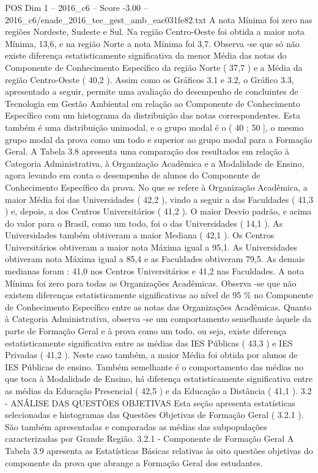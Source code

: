 \begin{textsample}{POS Dim 1 – 2016\_c6 – Score -3.00 – 2016\_c6/enade\_2016\_tec\_gest\_amb\_eac031fe82.txt}
A nota Mínima foi zero nas regiões Nordeste, Sudeste e Sul.
Na região Centro-Oeste foi obtida a maior nota Mínima, 13,6, e na região Norte a nota Mínima foi 3,7.
Observa -se que só não existe diferença estatisticamente significativa da menor Média das notas do Componente de Conhecimento Específico da região Norte ( 37,7 ) e a Média da região Centro-Oeste ( 40,2 ).
Assim como os Gráficos 3.1 e 3.2, o Gráfico 3.3, apresentado a seguir, permite uma avaliação do desempenho de concluintes de Tecnologia em Gestão Ambiental em relação ao Componente de Conhecimento Específico com um histograma da distribuição das notas correspondentes.
Esta também é uma distribuição unimodal, e o grupo modal é o ( 40 ; 50 ], o mesmo grupo modal da prova como um todo e superior ao grupo modal para a Formação Geral.
A Tabela 3.8 apresenta uma comparação dos resultados em relação à Categoria Administrativa, à Organização Acadêmica e a Modalidade de Ensino, agora levando em conta o desempenho de alunos do Componente de Conhecimento Específico da prova.
No que se refere à Organização Acadêmica, a maior Média foi das Universidades ( 42,2 ), vindo a seguir a das Faculdades ( 41,3 ) e, depois, a dos Centros Universitários ( 41,2 ).
O maior Desvio padrão, e acima do valor para o Brasil, como um todo, foi o das Universidades ( 14,1 ).
As Universidades também obtiveram a maior Mediana ( 42,1 ).
Os Centros Universitários obtiveram a maior nota Máxima igual a 95,1.
As Universidades obtiveram nota Máxima igual a 85,4 e as Faculdades obtiveram 79,5.
As demais medianas foram : 41,0 nos Centros Universitários e 41,2 nas Faculdades.
A nota Mínima foi zero para todas as Organizações Acadêmicas.
Observa -se que não existem diferenças estatisticamente significativas ao nível de 95 \% no Componente de Conhecimento Específico entre as notas das Organizações Acadêmicas.
Quanto à Categoria Administrativa, observa -se um comportamento semelhante àquele da parte de Formação Geral e à prova como um todo, ou seja, existe diferença estatisticamente significativa entre as médias das IES Públicas ( 43,3 ) e IES Privadas ( 41,2 ).
Neste caso também, a maior Média foi obtida por alunos de IES Públicas de ensino.
Também semelhante é o comportamento das médias no que toca à Modalidade de Ensino, há diferença estatisticamente significativa entre as médias da Educação Presencial ( 42,5 ) e da Educação a Distância ( 41,1 ). 3.2 - ANÁLISE DAS QUESTÕES OBJETIVAS Esta seção apresenta estatísticas selecionadas e histogramas das Questões Objetivas de Formação Geral ( 3.2.1 ).
São também apresentadas e comparadas as médias das subpopulações caracterizadas por Grande Região. 3.2.1 - Componente de Formação Geral A Tabela 3.9 apresenta as Estatísticas Básicas relativas às oito questões objetivas do componente da prova que abrange a Formação Geral dos estudantes.

\end{textsample}
